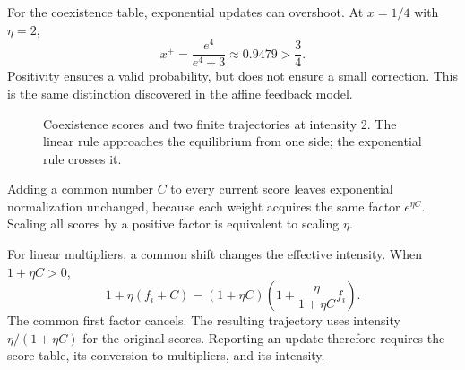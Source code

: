 \documentclass[11pt,oneside,openany]{book}
\theoremstyle{definition}
\theoremstyle{remark}
\numberwithin{equation}{chapter}
\begin{document}
For the coexistence table, exponential updates can overshoot. At \(x=1/4\) with \(\eta=2\), \[x^+=\frac{e^4}{e^4+3}\approx0.9479>\frac34.\] Positivity ensures a valid probability, but does not ensure a small correction. This is the same distinction discovered in the affine feedback model.

\begin{figure}[htbp]\centering
{}
\caption{Coexistence scores and two finite trajectories at intensity 2. The linear rule approaches the equilibrium from one side; the exponential rule crosses it.}\end{figure}

Adding a common number \(C\) to every current score leaves exponential normalization unchanged, because each weight acquires the same factor \(e^{\eta C}\). Scaling all scores by a positive factor is equivalent to scaling \(\eta\).

For linear multipliers, a common shift changes the effective intensity. When \(1+\eta C>0\), \[1+\eta(f_i+C)=(1+\eta C)\left(1+\frac{\eta}{1+\eta C}f_i\right).\] The common first factor cancels. The resulting trajectory uses intensity \(\eta/(1+\eta C)\) for the original scores. Reporting an update therefore requires the score table, its conversion to multipliers, and its intensity.
\end{document}
